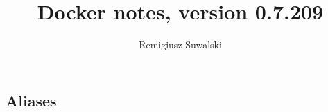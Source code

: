 \documentclass{charun}
\title{Docker notes, version 0.7.209}
\author{Remigiusz Suwalski}
\begin{document}
\begin{multicols*}{2}
\maketitle
\raggedright







\section{Aliases}


\end{multicols*}
\end{document}
